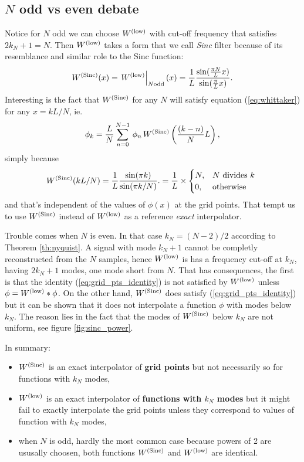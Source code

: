\subsection{\bf $N$ odd vs even debate}

\noindent Notice for $N$ odd we can choose $W^\mathrm{(low)}$ with cut-off frequency that satisfies 
$2 k_N + 1 = N$. Then $W^\mathrm{(low)}$ takes a form that we call \emph{Sinc} filter
because of its resemblance and similar role to the Sinc function:
\begin{equation}
    W^\mathrm{(Sinc)}(x)
     = \left.W^\mathrm{(low)}\right|_{N\text{odd}}(x)
  = \frac{1}{L} \frac{  \sin(\frac{\pi N}{L} x)  }{\sin(\frac{\pi}{L}x)}.
  \label{eq:sinc}
\end{equation}
Interesting is the fact that $W^\mathrm{(Sinc)}$ for any $N$ will satisfy equation
(\ref{eq:whittaker}) for any $x = k L / N$, ie.
\begin{equation}
    \phi_k = 
            \frac{L}{N} \sum_{n=0}^{N-1} \,
                \phi_n\,
                 W^\mathrm{(Sinc)}\left(\frac{(k-n)}{N}L\right),
    \label{eq:grid_pts_identity}
\end{equation}
simply because
\begin{equation}
    W^\mathrm{(Sinc)}( k L/N)
  = \frac{1}{L} \frac{  \sin(\pi k)  }{\sin(\pi k/N)}.
  = \frac{1}{L} \times 
    \begin{cases}
    N, & \text{$N$ divides $k$ }\\
    0, & \text{otherwise}
    \end{cases}
\end{equation}
and that's independent of the values of $\phi(x)$ at the grid points.
That tempt us to use $W^\mathrm{(Sinc)}$ instead of $W^\mathrm{(low)}$ as
a reference \emph{exact} interpolator.

Trouble comes when $N$ is even.
In that case $k_N = ( N-2 )/ 2$ according to Theorem \ref{th:nyquist}.
A signal with mode $k_N+1$ cannot be completly reconstructed from 
the $N$ samples, hence $W^\mathrm{(low)}$ is has a frequency cut-off at $k_N$,
having $2 k_N+1$ modes, one mode short from $N$.
That has consequences, the first is that the identity 
(\ref{eq:grid_pts_identity}) is not satisfied by $W^\mathrm{(low)}$
unless $\phi = W^\mathrm{(low)} * \phi$.
On the other hand, $W^\mathrm{(Sinc)}$ does satisfy (\ref{eq:grid_pts_identity})
but it can be shown that it does not interpolate a function $\phi$
with modes below $k_N$. The reason lies in the fact that
the modes of $W^\mathrm{(Sinc)}$ below $k_N$ are not uniform, see figure
\ref{fig:sinc_power}.

In summary:
\begin{itemize}
    \item $W^\mathrm{(Sinc)}$ is an exact interpolator of {\bf grid points} but not necessarily
    so for functions with $k_N$ modes,
    \item $W^\mathrm{(low)}$ is an exact interpolator of {\bf functions with $k_N$ modes} but it
    might fail to exactly interpolate the grid points unless they correspond to
    values of function with $k_N$ modes,
    \item when $N$ is odd, hardly the most common case because powers of 2
    are ususally choosen, both functions $W^\mathrm{(Sinc)}$ and $W^\mathrm{(low)}$ are identical.
\end{itemize}

